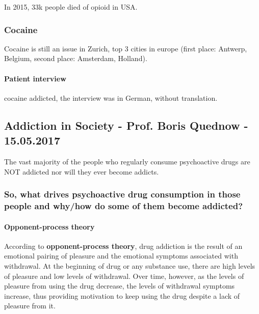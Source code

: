 \documentclass[12pt,article,oneside,a4paper]{memoir}
\begin{document}
In 2015, 33k people died of opioid in USA.

\subsubsection{Cocaine}
Cocaine is still an issue in Zurich, top 3 cities in europe (first place: Antwerp, Belgium, second place: Amsterdam, Holland).

\paragraph{Patient interview} cocaine addicted, the interview was in German, without translation.

\subsection{Addiction in Society - Prof. Boris Quednow - 15.05.2017}

The vast majority of the people who regularly consume psychoactive drugs are NOT addicted nor will they ever become addicts.

\subsubsection{So, what drives psychoactive drug consumption in those people and why/how do some of them become addicted?}

\paragraph{Opponent-process theory}
According to \textbf{opponent-process theory}, drug addiction is the result of an emotional pairing of pleasure and the emotional symptoms associated with withdrawal.
At the beginning of drug or any substance use, there are high levels of pleasure and low levels of withdrawal. Over time, however, as the levels of pleasure from using the drug decrease, the levels of withdrawal symptoms increase, thus providing motivation to keep using the drug despite a lack of pleasure from it.
\end{document}
